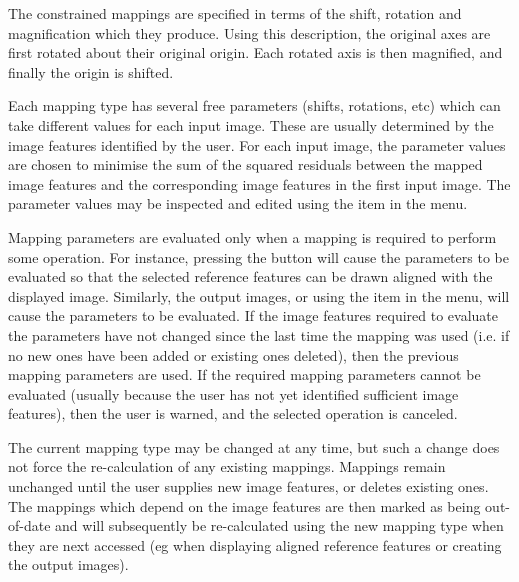 The constrained mappings are specified in terms of the shift, rotation and
magnification which they produce. Using this description, the original
axes are first rotated about their original origin. Each rotated axis is 
then magnified, and finally the origin is shifted.

Each mapping type has several free parameters (shifts, rotations, etc)
which can take different values for each input image. These are usually
determined by the image features identified by the user. For each input
image, the parameter values are chosen to minimise the sum of the squared
residuals between the mapped image features and the corresponding image
features in the first input image. The parameter values may be inspected
and edited using the  item
in the  menu.

Mapping parameters are evaluated only when a mapping is required to
perform some operation. For instance, pressing the  button will cause the parameters to be
evaluated so that the selected reference features can be drawn
aligned with the displayed image. Similarly,  
the output images, or using the 
item in the  menu, will cause the
parameters to be evaluated. If the image features required to evaluate
the parameters have not changed since the last time the mapping was used
(i.e. if no new ones have been added or existing ones deleted), then the
previous mapping parameters are used. If the required mapping parameters 
cannot be evaluated (usually because the user has not yet identified
sufficient image features), then the user is warned, and the selected
operation is canceled.

The current mapping type may be changed at any time, but such a change
does not force the re-calculation of any existing mappings. Mappings
remain unchanged until the user supplies new image features, or deletes
existing ones. The mappings which depend on the image features are then
marked as being out-of-date and will subsequently be re-calculated using
the new mapping type when they are next accessed (eg when displaying
aligned reference features or creating the output images).


